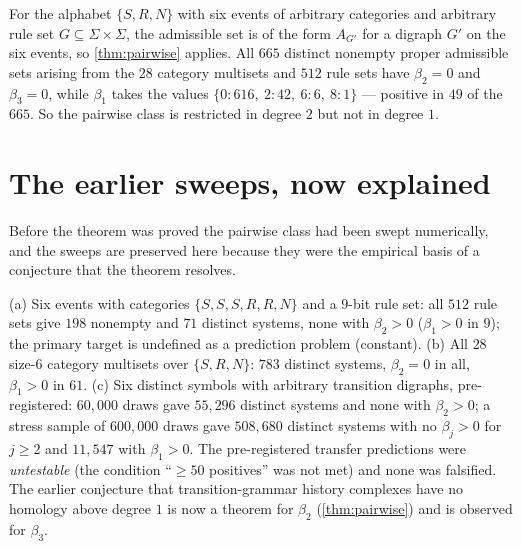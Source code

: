 \begin{corollary}\label{cor:symbolic}
For the alphabet $\{S,R,N\}$ with six events of arbitrary categories and arbitrary rule set $G\subseteq\Sigma\times\Sigma$, the admissible set is of the form $A_{G'}$ for a digraph $G'$ on the six events, so \cref{thm:pairwise} applies. All $665$ distinct nonempty proper admissible sets arising from the $28$ category multisets and $512$ rule sets have $\beta_2=0$ and $\beta_3=0$, while $\beta_1$ takes the values $\{0:616,\ 2:42,\ 6:6,\ 8:1\}$ --- positive in $49$ of the $665$. So the pairwise class is restricted in degree $2$ but not in degree $1$.
\end{corollary}

\section{The earlier sweeps, now explained}
Before the theorem was proved the pairwise class had been swept numerically, and the sweeps are preserved here because they were the empirical basis of a conjecture that the theorem resolves.
\begin{observation}\label{obs:sym}
(a) Six events with categories $\{S,S,S,R,R,N\}$ and a $9$-bit rule set: all $512$ rule sets give $198$ nonempty and $71$ distinct systems, none with $\beta_2>0$ ($\beta_1>0$ in $9$); the primary target is undefined as a prediction problem (constant). (b) All $28$ size-$6$ category multisets over $\{S,R,N\}$: $783$ distinct systems, $\beta_2=0$ in all, $\beta_1>0$ in $61$. (c) Six distinct symbols with arbitrary transition digraphs, pre-registered: $60{,}000$ draws gave $55{,}296$ distinct systems and none with $\beta_2>0$; a stress sample of $600{,}000$ draws gave $508{,}680$ distinct systems with no $\beta_j>0$ for $j\ge2$ and $11{,}547$ with $\beta_1>0$. The pre-registered transfer predictions were \emph{untestable} (the condition ``$\ge50$ positives'' was not met) and none was falsified. The earlier conjecture that transition-grammar history complexes have no homology above degree $1$ is now a theorem for $\beta_2$ (\cref{thm:pairwise}) and is observed for $\beta_3$.
\end{observation}

